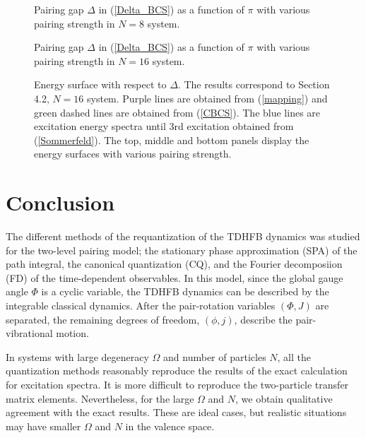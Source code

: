 \documentclass[%
superscriptaddress,
preprint,
showpacs,
nofootinbib,
amsmath,amssymb,
prc,
floatfix ]%
{revtex4-1}
\begin{document}
\begin{figure}[htbp]
 \begin{center}
 \end{center}
 \caption{Pairing gap $\Delta$ in (\ref{Delta_BCS}) as a function of $\pi$ with various pairing strength in $N=8$ system.}
 \label{fig:p_Delta1}
\end{figure}

\begin{figure}[htbp]
 \begin{center}
 \end{center}
 \caption{Pairing gap $\Delta$ in (\ref{Delta_BCS}) as a function of $\pi$ with various pairing strength in $N=16$ system.}
 \label{fig:p_Delta2}
\end{figure}

\begin{figure}[htbp]
 \begin{center}
 \end{center}
 \caption{Energy surface with respect to $\Delta$. The results correspond to Section 4.2, $N=16$ system. Purple lines are obtained from (\ref{mapping}) and green dashed lines are obtained from (\ref{CBCS}). The blue lines are excitation energy spectra until 3rd excitation obtained from (\ref{Sommerfeld}). The top, middle and bottom panels display the energy surfaces with various pairing strength.}
 \label{fig:Delta_E}
\end{figure}

\newpage


\section{Conclusion}

The different methods of the requantization of the TDHFB dynamics
was studied for the two-level pairing model;
the stationary phase approximation (SPA) of the path integral,
the canonical quantization (CQ), and the Fourier decomposiion (FD)
of the time-dependent observables.
In this model, since the global gauge angle $\Phi$ is a cyclic variable,
the TDHFB dynamics can be described by the integrable classical dynamics.
After the pair-rotation variables $(\Phi,J)$ are separated,
the remaining degrees of freedom, $(\phi,j)$, describe
the pair-vibrational motion.

In systems with large degeneracy $\Omega$ and number of particles $N$,
all the quantization methods reasonably reproduce the results of the
exact calculation for excitation spectra.
It is more difficult to reproduce the two-particle transfer matrix elements.
Nevertheless, for the large $\Omega$ and $N$,
we obtain qualitative agreement with the exact results.
These are ideal cases,
but realistic situations may have smaller $\Omega$ and $N$
in the valence space.
\end{document}
